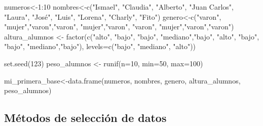 \documentclass[
]{book}
\newenvironment{Shaded}{\begin{snugshade}}{\end{snugshade}}
\newcommand{\AttributeTok}[1]{\textcolor[rgb]{0.77,0.63,0.00}{#1}}
\newcommand{\DecValTok}[1]{\textcolor[rgb]{0.00,0.00,0.81}{#1}}
\newcommand{\FunctionTok}[1]{\textcolor[rgb]{0.00,0.00,0.00}{#1}}
\newcommand{\NormalTok}[1]{#1}
\newcommand{\OtherTok}[1]{\textcolor[rgb]{0.56,0.35,0.01}{#1}}
\newcommand{\SpecialCharTok}[1]{\textcolor[rgb]{0.00,0.00,0.00}{#1}}
\newcommand{\StringTok}[1]{\textcolor[rgb]{0.31,0.60,0.02}{#1}}
\begin{document}
\begin{Shaded}
\begin{Highlighting}[]
\NormalTok{numeros}\OtherTok{\textless{}{-}}\DecValTok{1}\SpecialCharTok{:}\DecValTok{10}
\NormalTok{nombres}\OtherTok{\textless{}{-}}\FunctionTok{c}\NormalTok{(}\StringTok{"Ismael"}\NormalTok{, }\StringTok{"Claudia"}\NormalTok{, }\StringTok{"Alberto"}\NormalTok{, }\StringTok{"Juan Carlos"}\NormalTok{, }\StringTok{"Laura"}\NormalTok{, }\StringTok{"José"}\NormalTok{, }\StringTok{"Luis"}\NormalTok{, }\StringTok{"Lorena"}\NormalTok{, }\StringTok{"Charly"}\NormalTok{, }\StringTok{"Fito"}\NormalTok{)}
\NormalTok{genero}\OtherTok{\textless{}{-}}\FunctionTok{c}\NormalTok{(}\StringTok{"varon"}\NormalTok{, }\StringTok{"mujer"}\NormalTok{,}\StringTok{"varon"}\NormalTok{,}\StringTok{"varon"}\NormalTok{, }\StringTok{"mujer"}\NormalTok{,}\StringTok{"varon"}\NormalTok{, }\StringTok{"varon"}\NormalTok{, }\StringTok{"mujer"}\NormalTok{,}\StringTok{"varon"}\NormalTok{,}\StringTok{"varon"}\NormalTok{)}
\NormalTok{altura\_alumnos }\OtherTok{\textless{}{-}} \FunctionTok{factor}\NormalTok{(}\FunctionTok{c}\NormalTok{(}\StringTok{"alto"}\NormalTok{, }\StringTok{"bajo"}\NormalTok{, }\StringTok{"bajo"}\NormalTok{, }\StringTok{"mediano"}\NormalTok{,}\StringTok{"bajo"}\NormalTok{, }\StringTok{"alto"}\NormalTok{, }\StringTok{"bajo"}\NormalTok{, }\StringTok{"bajo"}\NormalTok{, }\StringTok{"mediano"}\NormalTok{,}\StringTok{"bajo"}\NormalTok{),}
                       \AttributeTok{levels=}\FunctionTok{c}\NormalTok{(}\StringTok{"bajo"}\NormalTok{, }\StringTok{"mediano"}\NormalTok{, }\StringTok{"alto"}\NormalTok{))}

\FunctionTok{set.seed}\NormalTok{(}\DecValTok{123}\NormalTok{) }
\NormalTok{peso\_alumnos }\OtherTok{\textless{}{-}} \FunctionTok{runif}\NormalTok{(}\AttributeTok{n=}\DecValTok{10}\NormalTok{, }\AttributeTok{min=}\DecValTok{50}\NormalTok{, }\AttributeTok{max=}\DecValTok{100}\NormalTok{)}

\NormalTok{mi\_primera\_base}\OtherTok{\textless{}{-}}\FunctionTok{data.frame}\NormalTok{(numeros, nombres, genero, altura\_alumnos, peso\_alumnos)}
\end{Highlighting}
\end{Shaded}

\hypertarget{muxe9todos-de-selecciuxf3n-de-datos}{%
\subsection{Métodos de selección de datos}\label{muxe9todos-de-selecciuxf3n-de-datos}}
\end{document}
